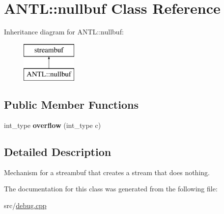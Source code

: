 \hypertarget{classANTL_1_1nullbuf}{\section{A\-N\-T\-L\-:\-:nullbuf Class Reference}
\label{classANTL_1_1nullbuf}
}
Inheritance diagram for A\-N\-T\-L\-:\-:nullbuf\-:\begin{figure}[H]
\begin{center}
\leavevmode
\includegraphics[height=2.000000cm]{d9/ddf/classANTL_1_1nullbuf}
\end{center}
\end{figure}
\subsection*{Public Member Functions}
\begin{DoxyCompactItemize}
\item 
\hypertarget{classANTL_1_1nullbuf_a535cf51861da38ddc0214972cd99de08}{int\-\_\-type {\bfseries overflow} (int\-\_\-type c)}\label{classANTL_1_1nullbuf_a535cf51861da38ddc0214972cd99de08}

\end{DoxyCompactItemize}


\subsection{Detailed Description}
Mechanism for a streambuf that creates a stream that does nothing. 

The documentation for this class was generated from the following file\-:\begin{DoxyCompactItemize}
\item 
src/\hyperlink{debug_8cpp}{debug.\-cpp}\end{DoxyCompactItemize}
